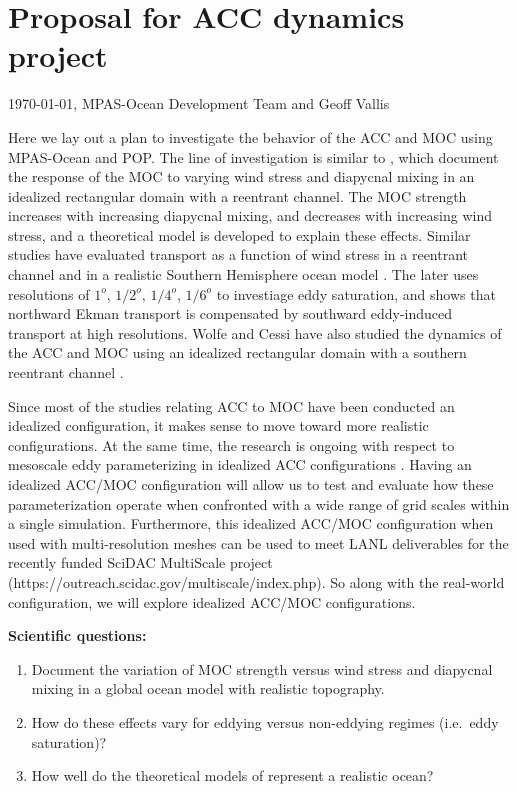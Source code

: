 \documentclass[12pt,letterpaper]{article}
\begin{document}
\section{Proposal for ACC dynamics project }
\today, MPAS-Ocean Development Team and Geoff Vallis

Here we lay out a plan to investigate the behavior of the ACC and MOC using MPAS-Ocean and POP.  The line of investigation is similar to \cite{Henning_Vallis05jpo,Nikurashin_Vallis11jpo,Nikurashin_Vallis12jpo}, which document the response of the MOC to varying wind stress and diapycnal mixing in an idealized rectangular domain with a reentrant channel.  The MOC strength increases with increasing diapycnal mixing, and decreases with increasing wind stress, and a theoretical model is developed to explain these effects.  Similar studies have evaluated transport as a function of wind stress in a reentrant channel \cite{Hallberg_Gnanadesikan01jpo} and in a realistic Southern Hemisphere ocean model \cite{Hallberg_Gnanadesikan06jpo}.  The later uses resolutions of $1^o$, $1/2^o$, $1/4^o$, $1/6^o$ to investiage eddy saturation, and shows that northward Ekman transport is compensated by southward eddy-induced transport at high resolutions.  Wolfe and Cessi have also studied the dynamics of the ACC and MOC using an idealized rectangular domain with a southern reentrant channel \cite{Wolfe_Cessi09jpo,Wolfe_Cessi10jpo,Wolfe_Cessi11jpo}.

Since most of the studies relating ACC to MOC have been conducted an idealized configuration, it makes sense to move toward more realistic configurations. At the same time, the research is ongoing with respect to mesoscale eddy parameterizing in idealized ACC configurations \cite{Ringler:2011hz, Chen:000}. Having an idealized ACC/MOC configuration will allow us to test and evaluate how these parameterization operate when confronted with a wide range of grid scales within a single simulation. Furthermore, this idealized ACC/MOC configuration when used with multi-resolution meshes can be used to meet LANL deliverables for the recently funded SciDAC MultiScale project (https://outreach.scidac.gov/multiscale/index.php). So along with the real-world configuration, we will explore idealized ACC/MOC configurations.


{\bf Scientific questions:}
\begin{enumerate}
\item Document the variation of MOC strength versus wind stress and diapycnal mixing in a global ocean model with realistic topography.
\item How do these effects vary for eddying versus non-eddying regimes (i.e.\ eddy saturation)?
\item How well do the theoretical models of \cite{Nikurashin_Vallis11jpo,Nikurashin_Vallis12jpo} represent a realistic ocean?
\end{enumerate}
\end{document}
